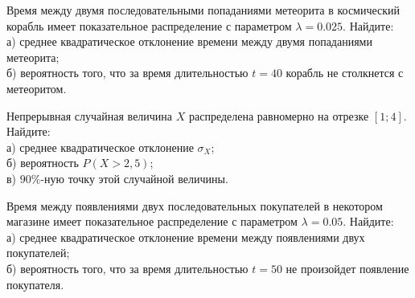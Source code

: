 \vfill

\z Время между двумя последовательными попаданиями метеорита в космический корабль имеет показательное распределение с параметром $\lambda = 0.025$. Найдите: \\ \quad а) среднее квадратическое отклонение времени между двумя попаданиями метеорита; \\ \quad б) вероятность того, что за время длительностью $t = 40$ корабль не столкнется с метеоритом.
 

\vfill

\newpage\setcounter{zad}{0}

\z Непрерывная случайная величина $X$ распределена равномерно на отрезке $[1; 4]$. Найдите: \\ \quad а) среднее квадратическое отклонение $\sigma_X$; \\ \quad б) вероятность $P(X>2{,}5)$; \\ \quad в) $90\%$-ную точку этой случайной величины.


\vfill

\z Время между появлениями двух последовательных покупателей в некотором магазине имеет показательное распределение с параметром $\lambda = 0.05$. Найдите: \\ \quad а) среднее квадратическое отклонение времени между появлениями двух покупателей; \\ \quad б) вероятность того, что за время длительностью $t = 50$ не произойдет появление покупателя.
 

\vfill

\newpage\setcounter{zad}{0}